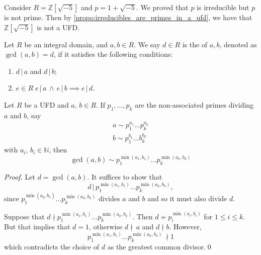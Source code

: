 \begin{eg}
  Consider $R = \mathbb{Z}[\sqrt{-5}]$ and $p = 1 + \sqrt{-5}$. We proved that $p$ is irreducible but $p$ is not prime. Then by \cref{propo:irreducibles_are_primes_in_a_ufd}, we have that $\mathbb{Z}[\sqrt{-5}]$ is not a UFD.
\end{eg}

\begin{defn}
\label{defn:greatest_common_divisor}
  Let $R$ be an integral domain, and $a, b \in R$. We say $d \in R$ is the  of $a, b$, denoted as $\gcd(a, b) = d$, if it satisfies the following conditions:
  \begin{enumerate}
    \item $d \, | \, a$ and $d \, | \, b$;
    \item $e \in R \; e \, | \, a \, \land \, e \, | \, b \implies e \, | \, d$.
  \end{enumerate}
\end{defn}

\begin{propo}
\label{propo:associates_of_the_gcd}
Let $R$ be a UFD and $a, \, b \in R$. If $p_1, ..., p_k$ are the non-associated primes dividing $a$ and $b$, say
  \begin{gather*}
    a \sim p_1^{a_1} \hdots p_k^{a_k} \\
    b \sim p_1^{b_1} \hdots b_k^{b_k}
  \end{gather*}
  with $a_i, \, b_i \in \mathbb{N}$, then
  \begin{equation*}
    \gcd(a, b) \sim p_1^{\min(a_1, b_1)} \hdots p_k^{\min(a_k, b_k)}
  \end{equation*}
\end{propo}

\begin{proof}
  Let $d = \gcd(a, b)$. It suffices to show that
  \begin{equation*}
    d \, | \, p_1^{\min(a_1, b_1)} \hdots p_k^{\min(a_k, b_k)},
  \end{equation*}
  since $p_1^{\min(a_q, b_1)} \hdots p_k^{\min(a_k, b_k)}$ divides $a$ and $b$ and so it must also divide $d$.

  Suppose that $d \nmid p_1^{\min(a_1, b_1)} \hdots p_k^{\min(a_k, b_k)}$. Then $d \not\sim p_i^{\min(a_i, b_i)}$ for $1 \leq i \leq k$. But that implies that $d = 1$, otherwise $d \nmid \, a$ and $d \nmid b$. However,
  \begin{equation*}
    p_1^{\min(a_1, b_1)} \hdots p_k^{\min(a_k, b_k)} \, \nmid 1
  \end{equation*}
  which contradicts the choice of $d$ as the greatest common divisor.\qed
\end{proof}

